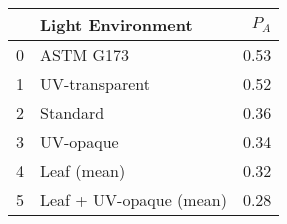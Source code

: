 \begin{tabular}{llr}
\toprule
{} &        Light Environment &  $P_A$ \\
\midrule
0 &                ASTM G173 &   0.53 \\
1 &           UV-transparent &   0.52 \\
2 &                 Standard &   0.36 \\
3 &                UV-opaque &   0.34 \\
4 &              Leaf (mean) &   0.32 \\
5 &  Leaf + UV-opaque (mean) &   0.28 \\
\bottomrule
\end{tabular}
